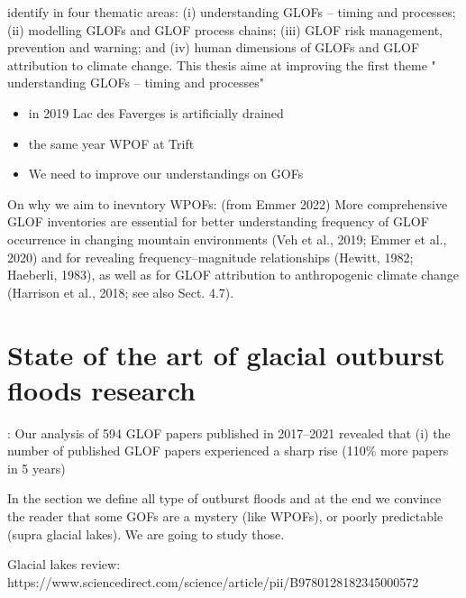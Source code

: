 \citet{Emmer&al2022} identify in four thematic areas: (i) understanding GLOFs – timing and processes; (ii) modelling GLOFs and GLOF process chains; (iii) GLOF risk management, prevention and warning; and (iv) human dimensions of GLOFs and GLOF attribution to climate change. This thesis aime at improving the first theme " understanding GLOFs – timing and processes"

\begin{itemize}
    \item in 2019 Lac des Faverges is artificially drained
    \item the same year WPOF at Trift
    \item We need to improve our understandings on GOFs
\end{itemize}

On why we aim to inevntory WPOFs: (from Emmer 2022) More comprehensive GLOF inventories are essential for better understanding frequency of GLOF occurrence in changing mountain environments (Veh et al., 2019; Emmer et al., 2020) and for revealing frequency–magnitude relationships (Hewitt, 1982; Haeberli, 1983), as well as for GLOF attribution to anthropogenic climate change (Harrison et al., 2018; see also Sect. 4.7).



\section{State of the art of glacial outburst floods research}

\citet{Emmer&al2022}: Our analysis of 594 GLOF papers published in 2017–2021 revealed that (i) the number of published GLOF papers experienced a sharp rise (110\% more papers in 5 years)

In the section we define all type of outburst floods and at the end we convince the reader that some GOFs are a mystery (like WPOFs), or poorly predictable (supra glacial lakes). We are going to study those. 

Glacial lakes review: https://www.sciencedirect.com/science/article/pii/B9780128182345000572


